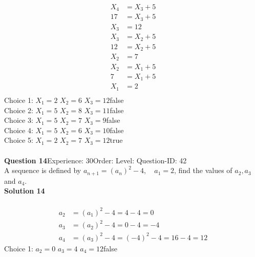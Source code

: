 \documentclass{article}
\begin{document}
\\[-35pt]\begin{align*}
X_4&=X_3+5\\[2pt]
17&=X_3+5\\[2pt]
X_3&=12\\[12pt]
X_3&=X_2+5\\[2pt]
12&=X_2+5\\[2pt]
X_2&=7\\[12pt]
X_2&=X_1+5\\[2pt]
7&=X_1+5\\[2pt]
X_1&=2\\[12pt]
\end{align*}
Choice 1: \hspace{20pt}$X_1=2 \,\, X_2=6 \,\, X_3=12$\hspace{20pt}false\\
Choice 2: \hspace{20pt}$X_1=5 \,\, X_2=8 \,\, X_3=11$\hspace{20pt}false\\
Choice 3: \hspace{20pt}$X_1=5 \,\, X_2=7 \,\, X_3=9$\hspace{20pt}false\\
Choice 4: \hspace{20pt}$X_1=5 \,\, X_2=6 \,\, X_3=10$\hspace{20pt}false\\
Choice 5: \hspace{20pt}$X_1=2 \,\, X_2=7 \,\, X_3=12$\hspace{20pt}true\\
\\[4pt]
\noindent\textbf{Question 14}\hspace{20pt}Experience: 30\hspace{20pt}Order: \hspace{20pt}Level: \hspace{20pt}Question-ID: 42\\[2pt]
A sequence is defined by $a_{n+1}=(a_n)^2-4, \quad a_1=2$, find the values of $a_2,a_3$ and $a_4$.\\[4pt]
\noindent\textbf{Solution 14}\\[2pt]
\\[-35pt]\begin{align*}
a_2&=(a_1)^2-4=4-4=0\\[2pt]
a_3&=(a_2)^2-4=0-4=-4\\[2pt]
a_4&=(a_3)^2-4=(-4)^2-4=16-4=12
\end{align*}
Choice 1: \hspace{20pt}$a_2=0 \,\, a_3=4 \,\, a_4=12 $\hspace{20pt}false\\
\end{document}
